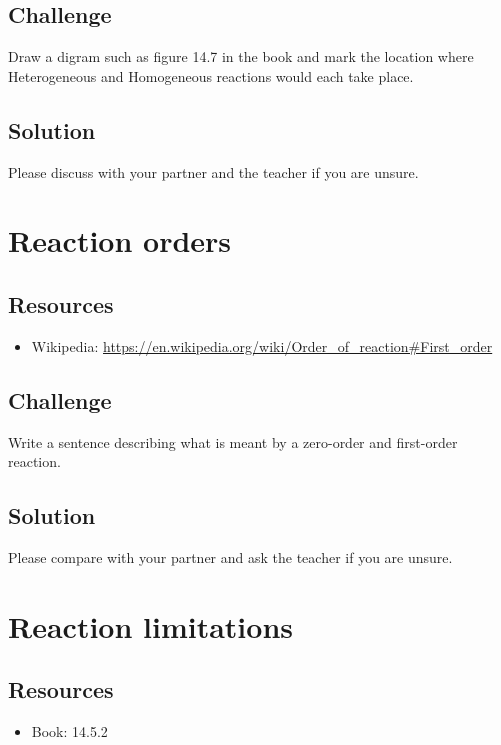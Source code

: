 \subsection*{Challenge}
Draw a digram such as figure 14.7 in the book and mark the location where Heterogeneous and Homogeneous reactions would each take place.

\subsection*{Solution}
Please discuss with your partner and the teacher if you are unsure.




\newpage
\section{Reaction orders}

\subsection*{Resources}
\begin{itemize}
    \item Wikipedia: \url{https://en.wikipedia.org/wiki/Order_of_reaction#First_order}
\end{itemize}

\subsection*{Challenge}
Write a sentence describing what is meant by a zero-order and first-order reaction.

\subsection*{Solution}
Please compare with your partner and ask the teacher if you are unsure.




\newpage
\section{Reaction limitations}

\subsection*{Resources}
\begin{itemize}
    \item Book: 14.5.2
\end{itemize}

